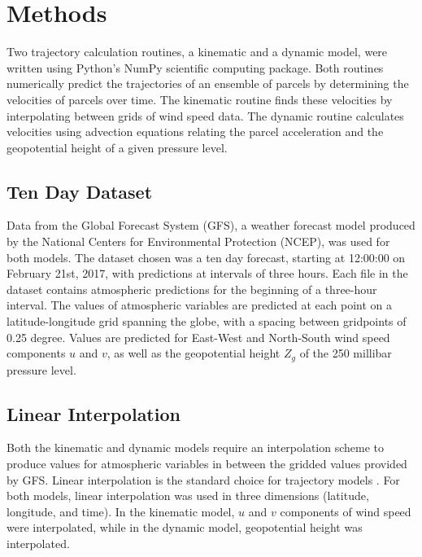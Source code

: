 \chapter{Methods}

Two trajectory calculation routines, a kinematic and a dynamic model, were written using Python's NumPy scientific computing package.
Both routines numerically predict the trajectories of an ensemble of parcels by determining the velocities of parcels over time. 
The kinematic routine finds these velocities by interpolating between grids of wind speed data. 
The dynamic routine calculates velocities using advection equations relating the parcel acceleration and the geopotential height of a given pressure level. 

\section{Ten Day Dataset}
Data from the Global Forecast System (GFS), a weather forecast model produced by the National Centers for Environmental Protection (NCEP), was used for both models.
The dataset chosen was a ten day forecast, starting at 12:00:00 on February 21st, 2017, with predictions at intervals of three hours.
Each file in the dataset contains atmospheric predictions for the beginning of a three-hour interval. 
The values of atmospheric variables are predicted at each point on a latitude-longitude grid spanning the globe, with a spacing between gridpoints of 0.25 degree.
Values are predicted for East-West and North-South wind speed components $u$ and $v$, as well as the geopotential height $Z_g$ of the 250 millibar pressure level.

\section{Linear Interpolation}
Both the kinematic and dynamic models require an interpolation scheme to produce values for atmospheric variables in between the gridded values provided by GFS. 
Linear interpolation is the standard choice for trajectory models \cite{bowman_input_2013}. 
For both models, linear interpolation was used in three dimensions (latitude, longitude, and time). 
In the kinematic model, $u$ and $v$ components of wind speed were interpolated, while in the dynamic model, geopotential height was interpolated.

